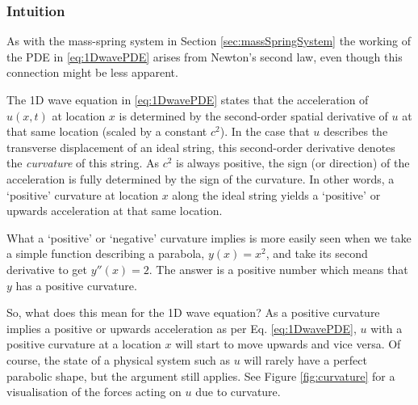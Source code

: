 \subsubsection{Intuition}



As with the mass-spring system in Section \ref{sec:massSpringSystem} the working of the PDE in \eqref{eq:1DwavePDE} arises from Newton's second law, even though this connection might be less apparent. %

The 1D wave equation in \eqref{eq:1DwavePDE} states that the acceleration of $u(x,t)$ at location $x$ is determined by the second-order spatial derivative of $u$ at that same location (scaled by a constant $c^2$). In the case that $u$ describes the transverse displacement of an ideal string, this second-order derivative denotes the \textit{curvature} of this string. As $c^2$ is always positive, the sign (or direction) of the acceleration is fully determined by the sign of the curvature. In other words, a `positive' curvature at location $x$ along the ideal string yields a `positive' or upwards acceleration at that same location. 

What a `positive' or `negative' curvature implies is more easily seen when we take a simple function describing a parabola, $y(x) = x^2$, and take its second derivative to get $y''(x) = 2$. The answer is a positive number which means that $y$ has a positive curvature. 

So, what does this mean for the 1D wave equation? As a positive curvature implies a positive or upwards acceleration as per Eq. \eqref{eq:1DwavePDE}, $u$ with a positive curvature at a location $x$ will start to move upwards and vice versa. Of course, the state of a physical system such as $u$ will rarely have a perfect parabolic shape, but the argument still applies. See Figure \ref{fig:curvature} for a visualisation of the forces acting on $u$ due to curvature.

